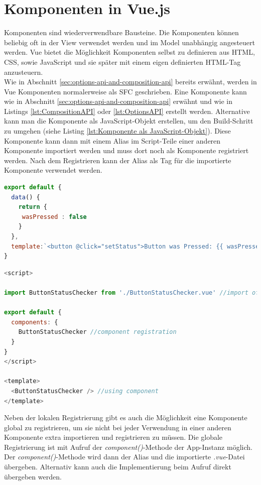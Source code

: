 \section{Komponenten in Vue.js}\label{sec:komponenten-in-vue.js}
Komponenten sind wiederverwendbare Bausteine.
Die Komponenten können beliebig oft in der View verwendet werden und im Model unabhängig angesteuert werden.
Vue bietet die Möglichkeit Komponenten selbst zu definieren aus HTML, CSS, sowie JavaScript und sie später mit einem
eigen definierten HTML-Tag anzusteuern. \cite[S. 11-12]{steyer2019}
\\
Wie in Abschnitt \ref{sec:options-api-and-composition-api} bereits erwähnt, werden in Vue Komponenten normalerweise als SFC geschrieben.
Eine Komponente kann wie in Abschnitt \ref{sec:options-api-and-composition-api} erwähnt und wie in Listings \ref{lst:CompositionAPI} oder \ref{lst:OptionsAPI}
erstellt werden.
Alternative kann man die Komponente als JavaScript-Objekt erstellen, um den Build-Schritt zu umgehen (siehe Listing \ref{lst:Komponente als JavaScript-Objekt}).
Diese Komponente kann dann mit einem Alias im Script-Teile einer anderen Komponente importiert werden und muss dort noch als Komponente
registriert werden.
Nach dem Registrieren kann der Alias als Tag für die importierte Komponente verwendet werden. \cite{vueComponents}


\begin{lstlisting}[caption={Komponente als JavaScript-Objekt},language=javascript,label={lst:Komponente als JavaScript-Objekt}]
export default {
  data() {
    return {
     wasPressed : false
    }
  },
  template:`<button @click="setStatus">Button was Pressed: {{ wasPressed }}</button>`
}
\end{lstlisting}


\begin{lstlisting}[caption={Verwendung einer Komponente},language=javascript,label={lst:Verwendung einer Komponente}]
<script>

import ButtonStatusChecker from './ButtonStatusChecker.vue' //import of component

export default {
  components: {
    ButtonStatusChecker //component registration
  }
}
</script>

<template>
  <ButtonStatusChecker /> //using component
</template>
\end{lstlisting}

Neben der lokalen Registrierung gibt es auch die Möglichkeit eine Komponente global
zu registrieren, um sie nicht bei jeder Verwendung in einer anderen Komponente
extra importieren und registrieren zu müssen.
Die globale Registrierung ist mit Aufruf der \emph{component()}-Methode der App-Instanz möglich.
Der \emph{component()}-Methode wird dann der Alias und die importierte \emph{.vue}-Datei übergeben.
Alternativ kann auch die Implementierung beim Aufruf direkt übergeben werden. \cite{vueComponentsRegistration}

